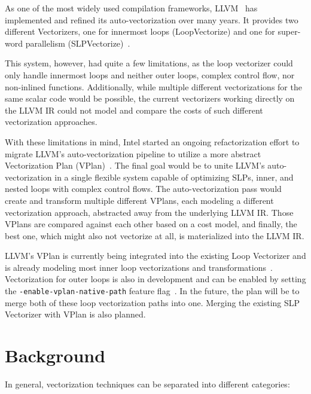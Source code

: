 \documentclass[sigplan,11pt,nonacm]{acmart}
\begin{document}
As one of the most widely used compilation frameworks, LLVM~\cite{10.5555/977395.977673} has 
implemented and refined its auto-vectorization over many years. It provides two different 
Vectorizers, one for innermost loops (LoopVectorize) and one for super-word parallelism 
(SLPVectorize)~\cite{llvmvec}.

This system, however, had quite a few limitations, as the loop vectorizer could only handle
innermost loops and neither outer loops, complex control flow, nor non-inlined functions. 
Additionally, while multiple different vectorizations for the same scalar code 
would be possible, the current vectorizers working directly on the LLVM IR could not model
and compare the costs of such different vectorization approaches.

With these limitations in mind, Intel started an ongoing refactorization effort to migrate LLVM's
auto-vectorization pipeline to utilize a more abstract Vectorization Plan 
(VPlan)~\cite{llvmextloopvec,llvmvplan}. The final goal would be to unite LLVM's auto-vectorization
in a single flexible system capable of optimizing SLPs, inner, and nested loops with complex 
control flows. The auto-vectorization pass would create and transform multiple different 
VPlans, each modeling a different vectorization approach, abstracted away from the underlying LLVM IR.
Those VPlans are compared against each other based on a cost model, and finally, the best one, which
might also not vectorize at all, is materialized into the LLVM IR.

LLVM's VPlan is currently being integrated into the existing Loop Vectorizer and is
already modeling most inner loop vectorizations and transformations~\cite{llvmvplanupdate}. 
Vectorization for outer loops is also in development and can be enabled by setting 
the \texttt{-enable-\allowbreak vplan-\allowbreak native-\allowbreak path} feature 
flag~\cite{llvmouterloop,llvmouterloopstatus}. 
In the future, the plan will be to merge both of these loop vectorization paths into one. 
Merging the existing SLP Vectorizer with VPlan is also planned.




\section{Background}
\label{sec:background}
In general, vectorization techniques can be separated into different categories:
\end{document}
